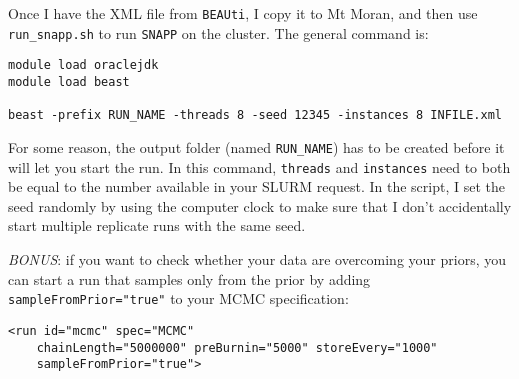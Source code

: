 Once I have the XML file from \texttt{BEAUti}, I copy it to Mt Moran, and then use \texttt{run\_snapp.sh} to run \texttt{SNAPP} on the cluster. The general command is:

\begin{verbatim}
module load oraclejdk
module load beast

beast -prefix RUN_NAME -threads 8 -seed 12345 -instances 8 INFILE.xml
\end{verbatim}

For some reason, the output folder (named \texttt{RUN\_NAME}) has to be created before it will let you start the run. In this command, \texttt{threads} and \texttt{instances} need to both be equal to the number available in your SLURM request. In the script, I set the seed randomly by using the computer clock to make sure that I don't accidentally start multiple replicate runs with the same seed.

\textit{BONUS}: if you want to check whether your data are overcoming your priors, you can start a run that samples only from the prior by adding \texttt{sampleFromPrior="true"} to your MCMC specification:

\begin{verbatim}
<run id="mcmc" spec="MCMC" 
	chainLength="5000000" preBurnin="5000" storeEvery="1000" 
    sampleFromPrior="true">
\end{verbatim}
